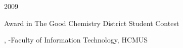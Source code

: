 

\begin{twocolentry}{2009}
	\begin{highlights}
		\item Award in The Good Chemistry District Student Contest
	\end{highlights}
\end{twocolentry}

\begin{onecolentry}
	\begin{highlights}
		\item {}, -Faculty of Information Technology, HCMUS
	\end{highlights}
\end{onecolentry}
